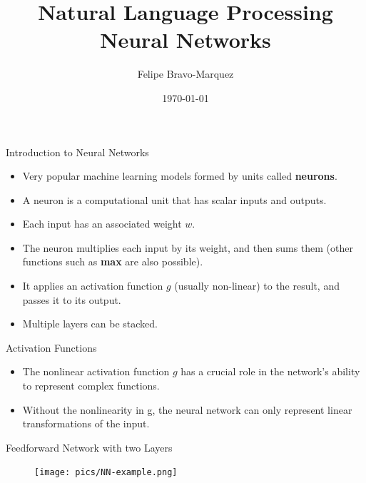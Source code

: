 \documentclass[handout]{beamer}
\title{Natural Language Processing \\ Neural Networks}
\author[Felipe Bravo Márquez]{\footnotesize
 \textcolor[rgb]{0.00,0.00,1.00}{Felipe Bravo-Marquez}}
\date{\today}
\begin{document}
\begin{frame}
\titlepage


\end{frame}





\begin{frame}{Introduction to Neural Networks}
\begin{scriptsize}
\begin{itemize}
\item Very popular machine learning models formed by units called \textbf{neurons}.
\item A neuron is a computational unit that has scalar inputs and outputs. 
\item  Each input has an associated weight $w$.
 \item The neuron multiplies each input by its weight, and then sums them (other functions such as \textbf{max} are also possible). 
\item It applies an activation function $g$ (usually non-linear) to the result, and passes it to its output.
\item Multiple layers can be stacked.
\end{itemize}


\end{scriptsize}
\end{frame}


\begin{frame}{Activation Functions}

\begin{scriptsize}
\begin{itemize}
\item The nonlinear activation function $g$ has a crucial role in the network's ability to represent complex functions. 
\item Without the nonlinearity in g, the neural network can only represent linear transformations of the input.
\end{itemize}


\end{scriptsize}


\end{frame}


\begin{frame}{Feedforward Network with two Layers}


\begin{figure}[htb]
	\centering
	 \texttt{[image: pics/NN-example.png]}
\end{figure}


\end{frame}
\end{document}
